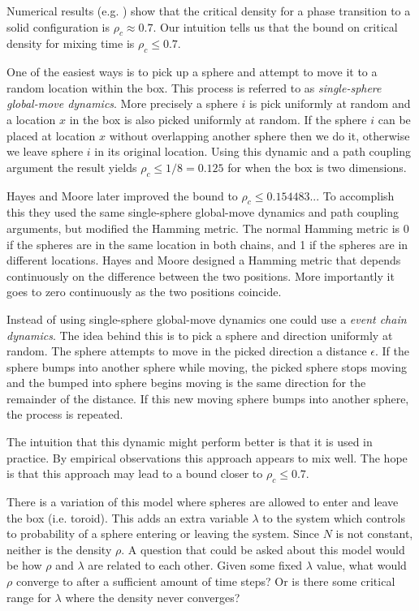 \documentclass[a4paper,11pt]{article}
\begin{document}
Numerical results (e.g. \cite{Mak}\cite{Piasecki}) show that the critical density for a phase transition to a solid configuration is $\rho_c \approx 0.7$. Our intuition tells us that the bound on critical density for mixing time is $\rho_c \le 0.7$. 

One of the easiest ways is to pick up a sphere and attempt to move it to a random location within the box.  This process is referred to as \textit{single-sphere global-move dynamics}.  More precisely a sphere $i$ is pick uniformly at random and a location $x$ in the box is also picked uniformly at random.  If the sphere $i$ can be placed at location $x$ without overlapping another sphere then we do it, otherwise we leave sphere $i$ in its original location.  Using this dynamic and a path coupling argument the result yields $\rho_c \le 1/8 = 0.125$ \cite{Kannan} for when the box is two dimensions.

Hayes and Moore \cite{Hayes} later improved the bound to $\rho_c \le 0.154483..$.  To accomplish this they used the same single-sphere global-move dynamics and path coupling arguments, but modified the Hamming metric.  The normal Hamming metric is 0 if the spheres are in the same location in both chains, and 1 if the spheres are in different locations.  Hayes and Moore designed a Hamming metric that depends continuously on the difference between the two positions.  More importantly it goes to zero continuously as the two positions coincide.

Instead of using single-sphere global-move dynamics one could use a \textit{event chain dynamics}.  The idea behind this is to pick a sphere and direction uniformly at random.  The sphere attempts to move in the picked direction a distance $\epsilon$.  If the sphere bumps into another sphere while moving, the picked sphere stops moving and the bumped into sphere begins moving is the same direction for the remainder of the distance.  If this new moving sphere bumps into another sphere, the process is repeated.

The intuition that this dynamic might perform better is that it is used in practice.  By empirical observations this approach appears to mix well.  The hope is that this approach may lead to a bound closer to $\rho_c \le 0.7$.

There is a variation of this model where spheres are allowed to enter and leave the box (i.e. toroid).  This adds an extra variable $\lambda$ to the system which controls to probability of a sphere entering or leaving the system.  Since $N$ is not constant, neither is the density $\rho$.  A question that could be asked about this model would be how $\rho$ and $\lambda$ are related to each other.  Given some fixed $\lambda$ value, what would $\rho$ converge to after a sufficient amount of time steps? Or is there some critical range for $\lambda$ where the density never converges?
\end{document}
